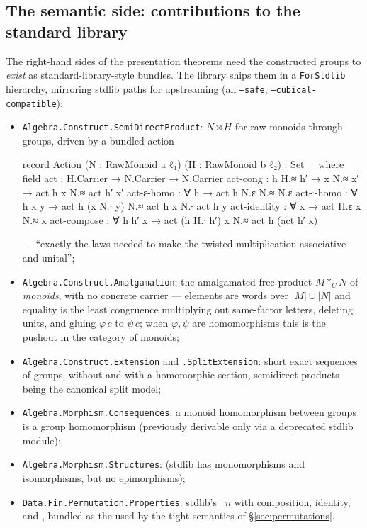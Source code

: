 \subsection{The semantic side: contributions to the standard library}\label{sec:forstdlib}

The right-hand sides of the presentation theorems need the constructed
groups to \emph{exist} as standard-library-style bundles.  The library
ships them in a \texttt{ForStdlib} hierarchy, mirroring stdlib paths for
upstreaming (all \texttt{--safe}, \texttt{--cubical-compatible}):

\begin{itemize}
\item \texttt{Algebra.Construct.SemiDirectProduct}: $N \rtimes H$ for raw
  monoids through groups, driven by a bundled action ---
\begin{agdacode}
record Action (N : RawMonoid a ℓ₁) (H : RawMonoid b ℓ₂) : Set _ where
  field
    act          : H.Carrier → N.Carrier → N.Carrier
    act-cong     : h H.≈ h′ → x N.≈ x′ → act h x N.≈ act h′ x′
    act-ε-homo   : ∀ h → act h N.ε N.≈ N.ε
    act-∙-homo   : ∀ h x y → act h (x N.∙ y) N.≈ act h x N.∙ act h y
    act-identity : ∀ x → act H.ε x N.≈ x
    act-compose  : ∀ h h′ x → act (h H.∙ h′) x N.≈ act h (act h′ x)
\end{agdacode}
  --- ``exactly the laws needed to make the twisted multiplication
  associative and unital'';
\item \texttt{Algebra.Construct.Amalgamation}: the amalgamated free
  product $M \ast_C N$ of \emph{monoids}, with no concrete carrier ---
  elements are words over $|M| \uplus |N|$ and equality is the least
  congruence multiplying out same-factor letters, deleting units, and
  gluing $\varphi\,c$ to $\psi\,c$; when $\varphi, \psi$ are
  homomorphisms this is the pushout in the category of monoids;
\item \texttt{Algebra.Construct.Extension} and
  \texttt{.SplitExtension}: short exact sequences of groups, without and
  with a homomorphic section, semidirect products being the canonical
  split model;
\item \texttt{Algebra.Morphism.Consequences}: a monoid homomorphism
  between groups is a group homomorphism (previously derivable only via a
  deprecated stdlib module);
\item \texttt{Algebra.Morphism.Structures}: 
  (stdlib has monomorphisms and isomorphisms, but no epimorphisms);
\item \texttt{Data.Fin.Permutation.Properties}: stdlib's
  ~$n$ with composition, identity, and ,
  bundled as the  used by the tight semantics of
  \S\ref{sec:permutations}.
\end{itemize}

